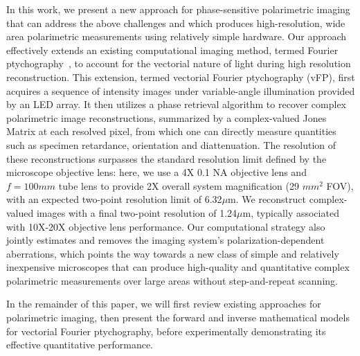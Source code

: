 \documentclass{article}
\begin{document}
In this work, we present a new approach for phase-sensitive polarimetric imaging that can address the above challenges and which produces high-resolution, wide area polarimetric measurements using relatively simple hardware. Our approach effectively extends an existing computational imaging method, termed Fourier ptychography~\cite{zheng2013wide}, to account for the vectorial nature of light during high resolution reconstruction. This extension, termed vectorial Fourier ptychography (vFP), first acquires a sequence of intensity images under variable-angle illumination provided by an LED array. It then utilizes a phase retrieval algorithm to recover complex polarimetric image reconstructions, summarized by a complex-valued Jones Matrix at each resolved pixel, from which one can directly measure quantities such as specimen retardance, orientation and diattenuation. The resolution of these reconstructions surpasses the standard resolution limit defined by the microscope objective lens: here, we use a 4X 0.1 NA objective lens and $f=100mm$ tube lens to provide 2X overall system magnification (29 $mm^2$ FOV), with an expected two-point resolution limit of 6.32$\mu$m. We reconstruct complex-valued images with a final two-point resolution of 1.24$\mu$m, typically associated with 10X-20X objective lens performance. Our computational strategy also jointly estimates and removes the imaging system’s polarization-dependent aberrations, which points the way towards a new class of simple and relatively inexpensive microscopes that can produce high-quality and quantitative complex polarimetric measurements over large areas without step-and-repeat scanning. 

In the remainder of this paper, we will first review existing approaches for polarimetric imaging, then present the forward and inverse mathematical models for vectorial Fourier ptychography, before experimentally demonstrating its effective quantitative performance. 
\end{document}
